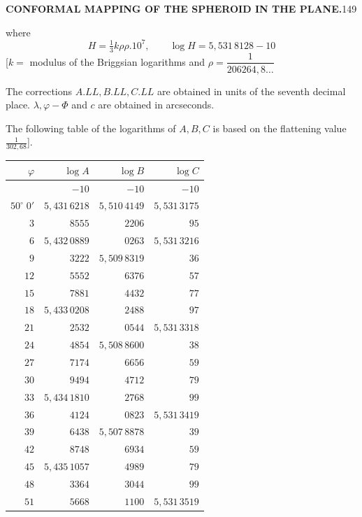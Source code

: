 \par\clearpage
\noindent\null\hfill{\small\textbf{CONFORMAL MAPPING OF THE SPHEROID IN THE PLANE.}}\hfill149\par\medskip
\noindent where
\[H=\tfrac13k\rho\rho.10^7,\qquad\log H=5{,}531\,8128-10\]
[\(k=\) modulus of the Briggsian logarithms and \(\rho=\dfrac1{206264{,}8\ldots}\)

The corrections \(A.LL,B.LL,C.LL\) are obtained in units of the seventh decimal place. \(\lambda,\varphi-\Phi\) and \(c\) are obtained in arcseconds.

The following table of the logarithms of \(A,B,C\) is based on the flattening value \(\frac1{302{,}68}\)].
\begin{center}
\begingroup\scriptsize\setlength{\tabcolsep}{2pt}\renewcommand{\arraystretch}{1.15}
\begin{tabular}[t]{|r|r|r|r|}\hline
\(\varphi\)&\(\log A\)&\(\log B\)&\(\log C\)\\\hline\hline
&\(-10\)&\(-10\)&\(-10\)\\
\(50^\circ\;0'\)&\(5{,}431\,6218\)&\(5{,}510\,4149\)&\(5{,}531\,3175\)\\
\(3\)&\(8555\)&\(2206\)&\(95\)\\
\(6\)&\(5{,}432\,0889\)&\(0263\)&\(5{,}531\,3216\)\\
\(9\)&\(3222\)&\(5{,}509\,8319\)&\(36\)\\
\(12\)&\(5552\)&\(6376\)&\(57\)\\
\(15\)&\(7881\)&\(4432\)&\(77\)\\
\hline
\(18\)&\(5{,}433\,0208\)&\(2488\)&\(97\)\\
\(21\)&\(2532\)&\(0544\)&\(5{,}531\,3318\)\\
\(24\)&\(4854\)&\(5{,}508\,8600\)&\(38\)\\
\(27\)&\(7174\)&\(6656\)&\(59\)\\
\(30\)&\(9494\)&\(4712\)&\(79\)\\
\hline
\(33\)&\(5{,}434\,1810\)&\(2768\)&\(99\)\\
\(36\)&\(4124\)&\(0823\)&\(5{,}531\,3419\)\\
\(39\)&\(6438\)&\(5{,}507\,8878\)&\(39\)\\
\(42\)&\(8748\)&\(6934\)&\(59\)\\
\(45\)&\(5{,}435\,1057\)&\(4989\)&\(79\)\\
\hline
\(48\)&\(3364\)&\(3044\)&\(99\)\\
\(51\)&\(5668\)&\(1100\)&\(5{,}531\,3519\)\\

\end{tabular}
\end{center}
